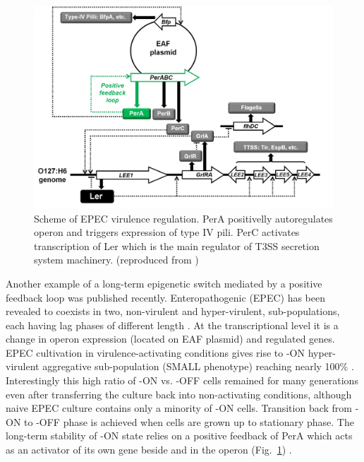 \begin{figure}[ht!]
  \centering
  \includegraphics[scale=0.2]{text/Pictures/perOperonRegulation.jpg}
    \caption{Scheme of EPEC virulence regulation. PerA positivelly autoregulates  operon and triggers expression of type IV pili. PerC activates transcription of Ler which is the main regulator of T3SS secretion system machinery. (reproduced from \cite{ronin2017long})}
    \label{per}
\end{figure}

Another example of a long-term epigenetic switch mediated by a positive feedback loop was published recently.
Enteropathogenic  (EPEC) has been revealed to coexists in two, non-virulent and hyper-virulent, sub-populations, each having lag phases of different length \cite{ronin2017long}.
At the transcriptional level it is a change in  operon expression (located on EAF plasmid) and  regulated genes.
EPEC cultivation in virulence-activating conditions gives rise to -ON hyper-virulent aggregative sub-population (SMALL phenotype) reaching nearly 100\% \cite{ronin2017long}.
Interestingly this high ratio of -ON vs. -OFF cells remained for many generations even after transferring the culture back into non-activating conditions, although naive EPEC culture contains only a minority of -ON cells.
Transition back from -ON to -OFF phase is achieved when cells are grown up to stationary phase.
The long-term stability of -ON state relies on a positive feedback of PerA which acts as an activator of its own gene beside  and  in the  operon (Fig.~\ref{per}) \cite{ibarra2003identification, ronin2017long}.


